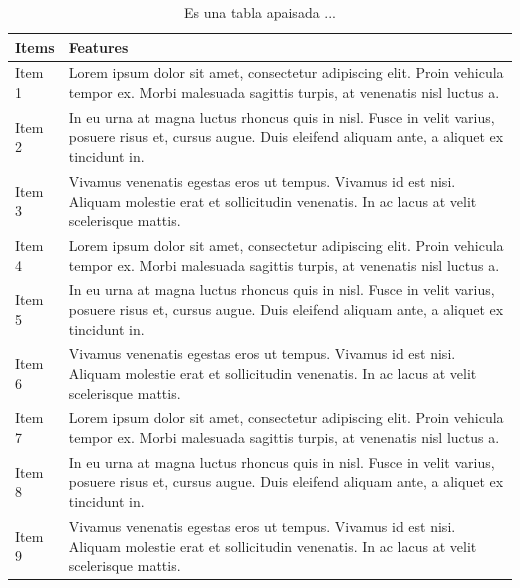 \documentclass[12pt,a4paper,]{book}
\numberwithin{dummy}{section}
\theoremstyle{ocrenumbox}
\theoremstyle{blacknumex}
\theoremstyle{blacknumbox}
\theoremstyle{ocrenum}
\theoremstyle{ocrenum}
\begin{document}
\begingroup
\begin{table}
\centering
\caption{Es una tabla apaisada ...} \label{tab:sidewaystable}

\begin{tabular}{>{\raggedright\arraybackslash}p{2cm}>{\raggedright\arraybackslash}p{14cm}}
\toprule
Items & Features\\
\midrule
Item 1 & Lorem ipsum dolor sit amet, consectetur adipiscing elit.
    Proin vehicula tempor ex. Morbi malesuada sagittis turpis,
    at venenatis nisl luctus \vphantom{2} a.\\
Item 2 & In eu urna at magna luctus rhoncus quis in nisl. Fusce in velit
    varius, posuere risus et, cursus augue. Duis eleifend aliquam ante,
    a aliquet ex tincidunt \vphantom{2} in.\\
Item 3 & Vivamus venenatis egestas eros ut tempus. Vivamus id est nisi.
    Aliquam molestie erat et sollicitudin venenatis. In ac lacus at
    velit scelerisque \vphantom{2} mattis.\\
Item 4 & Lorem ipsum dolor sit amet, consectetur adipiscing elit.
    Proin vehicula tempor ex. Morbi malesuada sagittis turpis,
    at venenatis nisl luctus \vphantom{1} a.\\
Item 5 & In eu urna at magna luctus rhoncus quis in nisl. Fusce in velit
    varius, posuere risus et, cursus augue. Duis eleifend aliquam ante,
    a aliquet ex tincidunt \vphantom{1} in.\\
\addlinespace
Item 6 & Vivamus venenatis egestas eros ut tempus. Vivamus id est nisi.
    Aliquam molestie erat et sollicitudin venenatis. In ac lacus at
    velit scelerisque \vphantom{1} mattis.\\
Item 7 & Lorem ipsum dolor sit amet, consectetur adipiscing elit.
    Proin vehicula tempor ex. Morbi malesuada sagittis turpis,
    at venenatis nisl luctus a.\\
Item 8 & In eu urna at magna luctus rhoncus quis in nisl. Fusce in velit
    varius, posuere risus et, cursus augue. Duis eleifend aliquam ante,
    a aliquet ex tincidunt in.\\
Item 9 & Vivamus venenatis egestas eros ut tempus. Vivamus id est nisi.
    Aliquam molestie erat et sollicitudin venenatis. In ac lacus at
    velit scelerisque mattis.\\
\bottomrule
\end{tabular}
\end{table}
\endgroup

\clearpage
\end{document}
